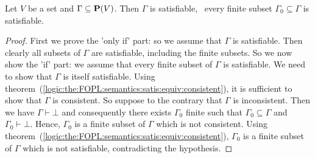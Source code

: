 \begin{theorem}[Compactness]\label{logic:the:FOPL:semantics:compactness}
Let $V$ be a set and $\Gamma\subseteq\mbox{${\bf P}(V)$}$. Then $\Gamma$ is
satisfiable, \ifand\ every finite subset $\Gamma_{0}\subseteq\Gamma$
is satisfiable.
\end{theorem}
\begin{proof}
First we prove the 'only if' part: so we assume that $\Gamma$ is
satisfiable. Then clearly all subsets of $\Gamma$ are satisfiable,
including the finite subsets. So we now show the 'if' part: we
assume that every finite subset of $\Gamma$ is satisfiable. We need
to show that $\Gamma$ is itself satisfiable. Using
theorem~(\ref{logic:the:FOPL:semantics:satis:equiv:consistent}), it
is sufficient to show that $\Gamma$ is consistent. So suppose to the
contrary that $\Gamma$ is inconsistent. Then we have
$\Gamma\vdash\bot$ and consequently there exists $\Gamma_{0}$ finite
such that $\Gamma_{0}\subseteq\Gamma$ and $\Gamma_{0}\vdash\bot$.
Hence, $\Gamma_{0}$ is a finite subset of $\Gamma$ which is not
consistent. Using
theorem~(\ref{logic:the:FOPL:semantics:satis:equiv:consistent}),
$\Gamma_{0}$ is a finite subset of $\Gamma$ which is not
satisfiable, contradicting the hypothesis.
\end{proof}
